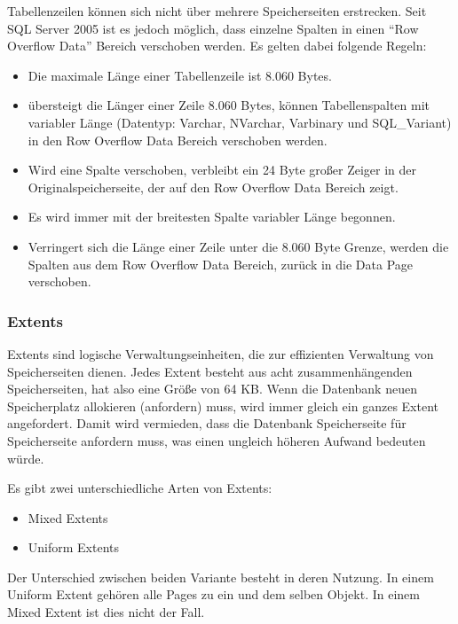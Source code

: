           Tabellenzeilen können sich nicht über mehrere Speicherseiten
          erstrecken. Seit SQL Server 2005 ist es jedoch möglich, dass
          einzelne Spalten in einen \enquote{Row Overflow Data} Bereich
          verschoben werden. Es gelten dabei folgende Regeln:
          \begin{itemize}
            \item Die maximale Länge einer Tabellenzeile ist 8.060 Bytes.
            \item übersteigt die Länger einer Zeile 8.060 Bytes, können
            Tabellenspalten mit variabler Länge (Datentyp: Varchar, NVarchar,
            Varbinary und SQL\_Variant) in den Row Overflow Data Bereich
            verschoben werden.
            \item Wird eine Spalte verschoben, verbleibt ein 24 Byte großer
            Zeiger in der Originalspeicherseite, der auf den Row Overflow Data
            Bereich zeigt.
            \item Es wird immer mit der breitesten Spalte variabler Länge
            begonnen.
            \item Verringert sich die Länge einer Zeile unter die 8.060 Byte
            Grenze, werden die Spalten aus dem Row Overflow Data Bereich,
            zurück in die Data Page verschoben.
          \end{itemize}
\clearpage         
        \subsubsection{Extents}
          \label{extentssection}
          Extents sind logische Verwaltungseinheiten, die zur effizienten
          Verwaltung von Speicherseiten dienen. Jedes Extent besteht aus acht
          zusammenhängenden Speicherseiten, hat also eine Größe von 64 KB.
          Wenn die Datenbank neuen Speicherplatz allokieren (anfordern) muss, wird
          immer gleich ein ganzes Extent angefordert. Damit wird vermieden, dass
          die Datenbank Speicherseite für Speicherseite anfordern muss, was
          einen ungleich höheren Aufwand bedeuten würde.
  
          Es gibt zwei unterschiedliche Arten von Extents:
          \begin{itemize}
            \item Mixed Extents
            \item Uniform Extents
          \end{itemize}
          Der Unterschied zwischen beiden Variante besteht in deren Nutzung. In
          einem Uniform Extent gehören alle Pages zu ein und dem selben Objekt.
          In einem Mixed Extent ist dies nicht der Fall.
